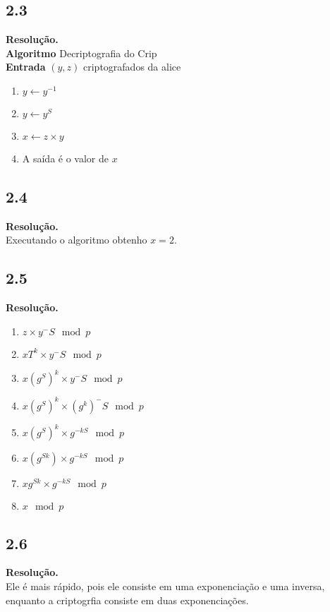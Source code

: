\documentclass[12pt,letterpaper]{article}
\newcommand\answer{\textbf{Resolução.}\xspace}
\begin{document}
\subsection*{2.3}
\answer \\
\textbf{Algoritmo} Decriptografia do Crip \\
\textbf{Entrada} $(y, z)$ criptografados da alice \\

\begin{enumerate}
    \item $y \leftarrow y^{-1}$
    \item $y \leftarrow y^{S}$
    \item $x \leftarrow z \times y$
    \item A saída é o valor de $x$
\end{enumerate}

\subsection*{2.4}
\answer \\
    Executando o algoritmo obtenho $x = 2$.

\subsection*{2.5}
\answer \\

\begin{enumerate}
    \item $z \times y^-S \mod p$
    \item $xT^k \times y^-S \mod p$
    \item $x(g^S)^k \times y^-S \mod p$
    \item $x(g^S)^k \times (g^k)^-S \mod p$
    \item $x(g^S)^k \times g^{-kS} \mod p$
    \item $x(g^{Sk}) \times g^{-kS} \mod p$
    \item $xg^{Sk} \times g^{-kS} \mod p$
    \item $x \mod p$
\end{enumerate}

\subsection*{2.6}
\answer \\
    Ele é mais rápido, pois ele consiste em uma exponenciação e uma inversa, enquanto a criptogrfia consiste em duas exponenciações.
\end{document}
